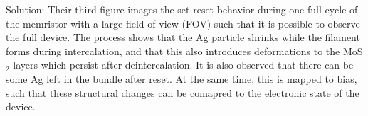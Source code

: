 \begin{homeworkProblem}
\begin{enumerate}[a)]
\begin{callout}{Solution:}
            Their third figure images the set-reset behavior during one full cycle of the memristor with a large field-of-view (FOV) such that it is possible to observe the full device. The process shows that the Ag particle shrinks while the filament forms during intercalation, and that this also introduces deformations to the MoS$_2$ layers which persist after deintercalation. It is also observed that there can be some Ag left in the bundle after reset. At the same time, this is mapped to bias, such that these structural changes can be comapred to the electronic state of the device.

            \end{callout}
    \end{enumerate}
\end{homeworkProblem}

\newpage
